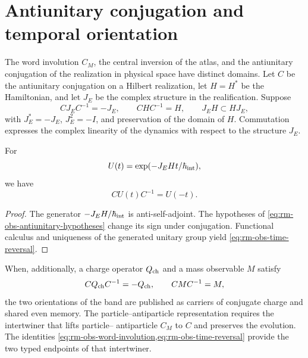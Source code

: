 \section{Antiunitary conjugation and temporal orientation}

The word involution \(C_M\), the central inversion of the atlas, and the
antiunitary conjugation of the realization in physical space have
distinct domains. Let \(C\) be the antiunitary conjugation on a Hilbert
realization, let \(H=H^*\) be the Hamiltonian, and let \(J_E\) be the complex structure
in the realification. Suppose
\begin{equation}
 CJ_EC^{-1}=-J_E,
 \qquad
 CHC^{-1}=H,
 \qquad
 J_EH\subset HJ_E,
 \label{eq:rm-obs-antiunitary-hypotheses}
\end{equation}
with \(J_E^*=-J_E\), \(J_E^2=-I\), and preservation of the domain of \(H\).
Commutation expresses the complex linearity of the dynamics with respect to
the structure \(J_E\).

\begin{proposition}
\label{prop:rm-obs-antiunitary-time}
For
\begin{equation}
 U(t)=\exp(-J_EHt/\hbar_{\rm int}),
 \label{eq:rm-obs-unitary-evolution}
\end{equation}
we have
\begin{equation}
 \boxed{CU(t)C^{-1}=U(-t).}
 \label{eq:rm-obs-time-reversal}
\end{equation}
\end{proposition}

\begin{proof}
The generator \(-J_EH/\hbar_{\rm int}\) is anti-self-adjoint. The hypotheses of
\cref{eq:rm-obs-antiunitary-hypotheses} change its sign under conjugation.
Functional calculus and uniqueness of the generated unitary group yield
\cref{eq:rm-obs-time-reversal}.
\end{proof}

When, additionally, a charge operator \(Q_{\rm ch}\) and a mass
observable \(M\) satisfy
\begin{equation}
 CQ_{\rm ch}C^{-1}=-Q_{\rm ch},
 \qquad
 CMC^{-1}=M,
 \label{eq:rm-obs-charge-mass-parity}
\end{equation}
the two orientations of the band are published as carriers of conjugate charge
and shared even memory. The particle--antiparticle representation requires the intertwiner that lifts particle--
antiparticle \(C_M\) to \(C\) and
preserves the evolution. The identities
\cref{eq:rm-obs-word-involution,eq:rm-obs-time-reversal} provide the
two typed endpoints of that intertwiner.

